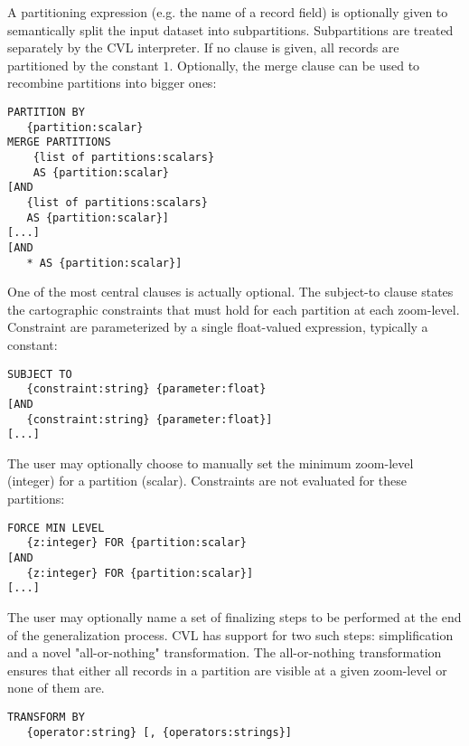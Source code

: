 A partitioning expression (e.g. the name of a record field) is optionally given to semantically split the input dataset into subpartitions. Subpartitions are treated separately by the CVL interpreter. If no clause is given, all records are partitioned by the constant $1$. Optionally, the merge clause can be used to recombine partitions into bigger ones:

\begin{lstlisting}
PARTITION BY
   {partition:scalar}
MERGE PARTITIONS    
    {list of partitions:scalars}
    AS {partition:scalar}
[AND 
   {list of partitions:scalars} 
   AS {partition:scalar}]
[...]
[AND 
   * AS {partition:scalar}]
\end{lstlisting}

One of the most central clauses is actually optional. The subject-to clause states the cartographic constraints that must hold for each partition at each zoom-level. Constraint are parameterized by a single float-valued expression, typically a constant:

\begin{lstlisting}
SUBJECT TO 
   {constraint:string} {parameter:float} 
[AND
   {constraint:string} {parameter:float}]
[...]
\end{lstlisting}

The user may optionally choose to manually set the minimum zoom-level (integer) for a partition (scalar). Constraints are not evaluated for these partitions:

\begin{lstlisting}
FORCE MIN LEVEL
   {z:integer} FOR {partition:scalar}
[AND
   {z:integer} FOR {partition:scalar}]
[...]
\end{lstlisting}

The user may optionally name a set of finalizing steps to be performed at the end of the generalization process. CVL has support for two such steps: simplification and a novel "all-or-nothing" transformation. The all-or-nothing transformation ensures that either all records in a partition are visible at a given zoom-level or none of them are.

\begin{lstlisting}
TRANSFORM BY
   {operator:string} [, {operators:strings}]
\end{lstlisting}


